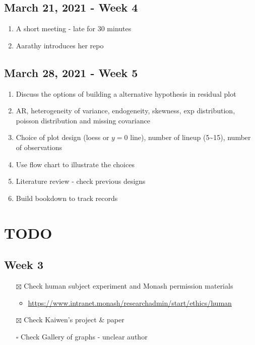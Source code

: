 \documentclass[
]{book}
\providecommand{\tightlist}{%
  \setlength{\itemsep}{0pt}\setlength{\parskip}{0pt}}
\begin{document}
\hypertarget{march-21-2021---week-4}{%
\section{March 21, 2021 - Week 4}\label{march-21-2021---week-4}}

\begin{enumerate}
\def\labelenumi{\arabic{enumi}.}
\tightlist
\item
  A short meeting - late for 30 minutes
\item
  Aarathy introduces her repo
\end{enumerate}

\hypertarget{march-28-2021---week-5}{%
\section{March 28, 2021 - Week 5}\label{march-28-2021---week-5}}

\begin{enumerate}
\def\labelenumi{\arabic{enumi}.}
\tightlist
\item
  Discuss the options of building a alternative hypothesis in residual plot
\item
  AR, heterogeneity of variance, endogeneity, skewness, exp distribution, poisson distribution and missing covariance
\item
  Choice of plot design (loess or \(y=0\) line), number of lineup (5\textasciitilde15), number of observations
\item
  Use flow chart to illustrate the choices
\item
  Literature review - check previous designs
\item
  Build bookdown to track records
\end{enumerate}

\hypertarget{todo}{%
\chapter{TODO}\label{todo}}

\hypertarget{week-3}{%
\section{Week 3}\label{week-3}}

\begin{itemize}
\tightlist
\item[$\boxtimes$]
  Check human subject experiment and Monash permission materials

  \begin{itemize}
  \tightlist
  \item
    \url{https://www.intranet.monash/researchadmin/start/ethics/human}
  \end{itemize}
\item[$\boxtimes$]
  Check Kaiwen's project \& paper
\item[$\square$]
  Check Gallery of graphs - unclear author
\end{itemize}
\end{document}
